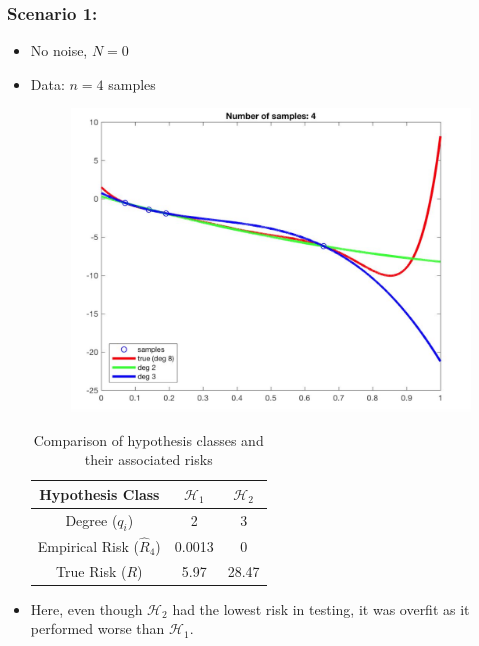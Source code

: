\subsubsection*{Scenario 1:}
\begin{itemize}
    \item No noise, $N=0$
    \item Data: $n=4$ samples
    \begin{figure}[H]
    \centering
    \includegraphics[width=0.55\linewidth]{img/3_4samp_noise.png}
    \end{figure}
    \begin{table}[H]
\centering
\begin{tabular}{ccc}
\hline
\textbf{Hypothesis Class} & \( \mathcal{H}_1 \) & \( \mathcal{H}_2 \) \\
\hline
Degree (\( q_i \)) & 2 & 3 \\
Empirical Risk (\( \hat{R}_4 \)) & 0.0013 & 0 \\
True Risk (\( R \)) & 5.97 & 28.47 \\
\hline
\end{tabular}
\caption{Comparison of hypothesis classes and their associated risks}
\label{tab:hypothesis_risks_4samp}
\end{table}
    \item Here, even though $\mathcal{H}_2$ had the lowest risk in testing, it was overfit as it performed worse than $\mathcal{H}_1$. 

\end{itemize}




